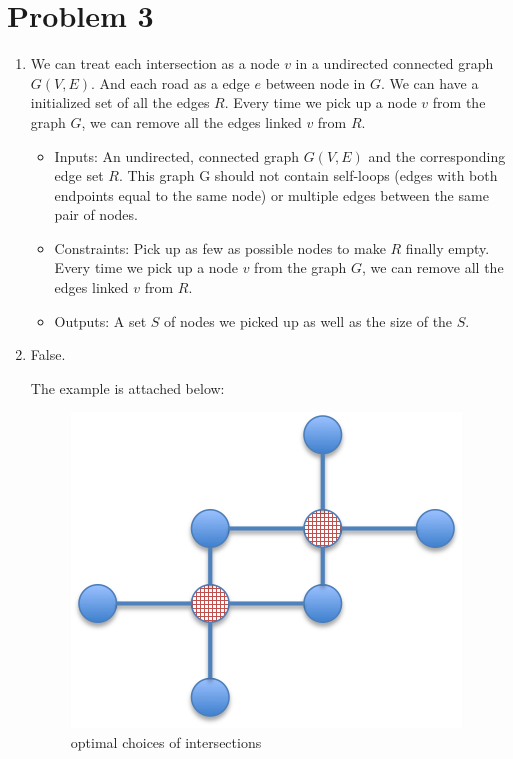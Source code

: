\documentclass{article} %
\begin{document}
\section*{Problem 3}
\begin{enumerate}
\item
	We can treat each intersection as a node $v$ in a undirected connected graph $G(V,E)$. And each road as a edge $e$ between node in $G$. We can have a initialized set of all the edges $R$. Every time we pick up a node $v$ from the graph $G$, we can remove all the edges linked $v$ from $R$.
    
    \begin{itemize}
	\item Inputs: An undirected, connected graph $G(V,E)$ and the corresponding edge set $R$. This graph G should not contain self-loops (edges with both endpoints equal to the same node) or multiple edges between the same pair of nodes.
    \item Constraints: Pick up as few as possible nodes to make $R$ finally empty. Every time we pick up a node $v$ from the graph $G$, we can remove all the edges linked $v$ from $R$.
    \item Outputs: A set $S$ of nodes we picked up as well as the size of the $S$.
	\end{itemize}

\item
	False.
    
	The example is attached below:
    \begin{figure}[H]
    \centering
	\includegraphics[width=\columnwidth, angle=0, scale=0.4]{pics/hw1_3_correct.png}
	\caption{optimal choices of intersections}
	\end{figure}
    

\end{enumerate}
\end{document}
